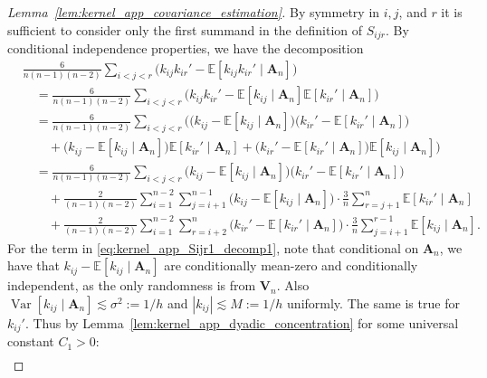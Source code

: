 \documentclass[11pt,lof]{puthesis}
\newcommand{\E}{\ensuremath{\mathbb{E}}}
\newcommand{\bA}{\ensuremath{\mathbf{A}}}
\newcommand{\bV}{\ensuremath{\mathbf{V}}}
\DeclareMathOperator{\Var}{Var}
\theoremstyle{break}
\theoremstyle{proof}
\newtheorem{proof}{Proof}
\begin{document}
\begin{proof}[Lemma~\ref{lem:kernel_app_covariance_estimation}]
  By symmetry in $i, j$, and $r$
  it is sufficient to consider only the first summand
  in the definition of $S_{i j r}$.
  By conditional independence properties,
  we have the decomposition
  \begin{align}
    \nonumber
    &\frac{6}{n(n-1)(n-2)}
    \sum_{i<j<r}
    \Big(
      k_{i j}k_{i r}'
      - \E[k_{i j}k_{i r}' \mid \bA_n]
    \Big) \\
    \nonumber
    &\quad=
    \frac{6}{n(n-1)(n-2)}
    \sum_{i<j<r}
    \Big(
      k_{i j}k_{i r}'
      - \E[k_{i j} \mid \bA_n]
      \E[k_{i r}' \mid \bA_n]
    \Big) \\
    \nonumber
    &\quad=
    \frac{6}{n(n-1)(n-2)}
    \sum_{i<j<r}
    \Big(
      \big(
        k_{i j}
        - \E[k_{i j} \mid \bA_n]
      \big)
      \big(
        k_{i r}'
        - \E[k_{i r}' \mid \bA_n]
      \big) \\
      \nonumber
      &\qquad+
      \big(
        k_{i j}
        - \E[k_{i j} \mid \bA_n]
      \big)
      \E[k_{i r}' \mid \bA_n]
      + \big(
        k_{i r}'
        - \E[k_{i r}' \mid \bA_n]
      \big)
      \E[k_{i j} \mid \bA_n]
    \Big) \\
    \label{eq:kernel_app_Sijr1_decomp1}
    &\quad=
    \frac{6}{n(n-1)(n-2)}
    \sum_{i<j<r}
    \Big(
      k_{i j}
      - \E[k_{i j} \mid \bA_n]
    \Big)
    \Big(
      k_{i r}'
      - \E[k_{i r}' \mid \bA_n]
    \Big) \\
    \label{eq:kernel_app_Sijr1_decomp2}
    &\qquad+
    \frac{2}{(n-1)(n-2)}
    \sum_{i=1}^{n-2}
    \sum_{j=i+1}^{n-1}
    \Big(
      k_{i j}
      - \E[k_{i j} \mid \bA_n]
    \Big)
    \cdot \frac{3}{n}
    \sum_{r=j+1}^n
    \E[k_{i r}' \mid \bA_n] \\
    \label{eq:kernel_app_Sijr1_decomp3}
    &\qquad+
    \frac{2}{(n-1)(n-2)}
    \sum_{i=1}^{n-2}
    \sum_{r=i+2}^n
    \Big(
      k_{i r}'
      - \E[k_{i r}' \mid \bA_n]
    \Big)
    \cdot \frac{3}{n}
    \sum_{j=i+1}^{r-1}
    \E[k_{i j} \mid \bA_n].
  \end{align}
  For the term in \eqref{eq:kernel_app_Sijr1_decomp1},
  note that conditional on $\bA_n$,
  we have that
  $k_{i j} - \E[k_{i j} \mid \bA_n]$
  are conditionally mean-zero
  and conditionally independent,
  as the only randomness is from $\bV_n$.
  Also
  $\Var[k_{i j} \mid \bA_n] \lesssim \sigma^2 := 1/h$
  and
  $|k_{i j}| \lesssim M := 1/h$
  uniformly.
  The same is true for $k_{i j}'$.
  Thus by Lemma~\ref{lem:kernel_app_dyadic_concentration}
  for some universal constant $C_1 > 0$:
  \begin{align*}

\end{align*}
\end{proof}
\end{document}
